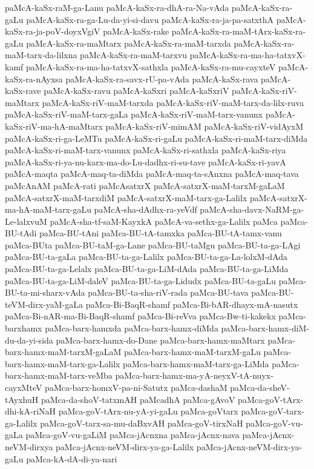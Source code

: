 {paMcA-kaSx-raM-ga-Lanu
paMcA-kaSx-ra-dhA-ra-Na-vAda
paMcA-kaSx-ra-gaLu
paMcA-kaSx-ra-ga-Lu-da-yi-si-davu
paMcA-kaSx-ra-ja-pa-satxthA
paMcA-kaSx-ra-ja-poV-doyxVgiV
paMcA-kaSx-rake
paMcA-kaSx-ra-maM-tArx-kaSx-ra-gaLu
paMcA-kaSx-ra-maMtarx
paMcA-kaSx-ra-maM-tarxda
paMcA-kaSx-ra-maM-tarx-da-lilxna
paMcA-kaSx-ra-maM-tarxvu
paMcA-kaSx-ra-ma-ha-tatxvX-kamf
paMcA-kaSx-ra-ma-ha-tatxvX-sathxla
paMcA-kaSx-ra-mu-cayxteV
paMcA-kaSx-ra-nAyxsa
paMcA-kaSx-ra-savx-rU-pa-vAda
paMcA-kaSx-rava
paMcA-kaSx-rave
paMcA-kaSx-ravu
paMcA-kaSxri
paMcA-kaSxriV
paMcA-kaSx-riV-maMtarx
paMcA-kaSx-riV-maM-tarxda
paMcA-kaSx-riV-maM-tarx-da-lilx-ruva
paMcA-kaSx-riV-maM-tarx-gaLa
paMcA-kaSx-riV-maM-tarx-vanunx
paMcA-kaSx-riV-ma-hA-maMtarx
paMcA-kaSx-riV-mimAM
paMcA-kaSx-riV-vidAyxM
paMcA-kaSx-ri-ga-LeMTu
paMcA-kaSx-ri-gaLu
paMcA-kaSx-ri-maM-tarx-diMda
paMcA-kaSx-ri-maM-tarx-vanunx
paMcA-kaSx-ri-sathxla
paMcA-kaSx-riya
paMcA-kaSx-ri-ya-nu-karx-ma-do-Lu-dadhx-ri-su-tave
paMcA-kaSx-ri-yavA
paMcA-maqta
paMcA-maq-ta-diMda
paMcA-maq-ta-sAnxna
paMcA-maq-tava
paMcAnAM
paMcA-rati
paMcAsatxrX
paMcA-satxrX-maM-tarxM-gaLaM
paMcA-satxrX-maM-tarxdiM
paMcA-satxrX-maM-tarx-ga-Lalilx
paMcA-satxrX-ma-hA-maM-tarx-gaLu
paMcA-sha-dAdhx-ra-yeVdf
paMcA-sha-davx-NaRM-ga-Le-lalxvuM
paMcA-sha-tf-saM-KayxkA
paMcA-va-sethx-ga-Lalilx
paMca
paMca-BU-tAdi
paMca-BU-tAni
paMca-BU-tA-tamxka
paMca-BU-tA-tamx-vanu
paMca-BUta
paMca-BU-taM-ga-Lane
paMca-BU-taMgu
paMca-BU-ta-ga-LAgi
paMca-BU-ta-gaLa
paMca-BU-ta-ga-Lalilx
paMca-BU-ta-ga-La-lolxM-dAda
paMca-BU-ta-ga-Lelalx
paMca-BU-ta-ga-LiM-dAda
paMca-BU-ta-ga-LiMda
paMca-BU-ta-ga-LiM-daleV
paMca-BU-ta-ga-Lidudx
paMca-BU-ta-gaLu
paMca-BU-ta-mi-sharx-vAda
paMca-BU-ta-sha-riV-rada
paMca-BU-tava
paMca-BU-teVM-dirx-yaM-gaLa
paMca-Bi-BaqR-shamf
paMca-Bi-bAR-dhayx-mA-nasutx
paMca-Bi-nAR-ma-Bi-BaqR-shamf
paMca-Bi-reVva
paMca-Bw-ti-kakekx
paMca-barxhamx
paMca-barx-hamxda
paMca-barx-hamx-diMda
paMca-barx-hamx-diM-du-da-yi-sida
paMca-barx-hamx-do-Dane
paMca-barx-hamx-maMtarx
paMca-barx-hamx-maM-tarxM-gaLaM
paMca-barx-hamx-maM-tarxM-gaLu
paMca-barx-hamx-maM-tarx-ga-Lalilx
paMca-barx-hamx-maM-tarx-ga-LiMda
paMca-barx-hamx-maM-tarx-veMba
paMca-barx-hamx-ma-yA-neyxV-tA-nuyx-cayxMteV
paMca-barx-homxV-pa-ni-Satutx
paMca-dashaM
paMca-da-sheV-tAyxhuH
paMca-da-shoV-tatxmAH
paMcadhA
paMca-gAvoV
paMca-goV-tArx-dhi-kA-riNaH
paMca-goV-tArx-nu-yA-yi-gaLu
paMca-goVtarx
paMca-goV-tarx-ga-Lalilx
paMca-goV-tarx-sa-mu-daBxvAH
paMca-goV-tirxNaH
paMca-goV-vu-gaLa
paMca-goV-vu-gaLiM
paMca-jAcnxna
paMca-jAcnx-nava
paMca-jAcnx-neVM-dirxya
paMca-jAcnx-neVM-dirx-ya-ga-Lalilx
paMca-jAcnx-neVM-dirx-ya-gaLu
paMca-kA-dA-di-ya-nari
}
